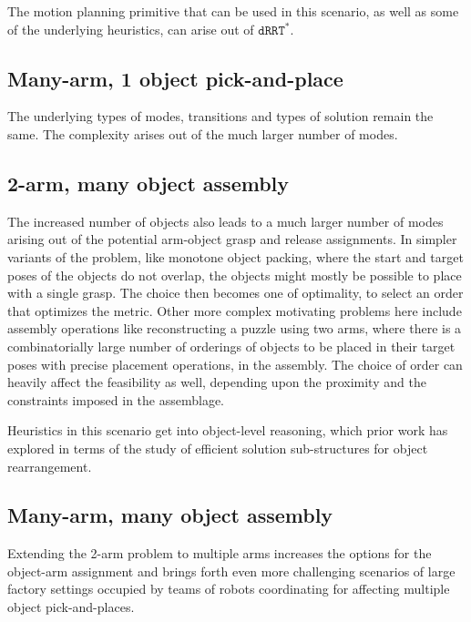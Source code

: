The motion planning primitive that can be used in this scenario, as well as some of the underlying heuristics, can arise out of $\mathtt{dRRT}^*$.

\subsection{Many-arm, 1 object pick-and-place}
The underlying types of modes, transitions and types of solution remain the same. The complexity arises out of the much larger number of modes.

\subsection{2-arm, many object assembly}
The increased number of objects also leads to a much larger number of modes arising out of the potential arm-object grasp and release assignments. In simpler variants of the problem, like monotone object packing, where the start and target poses of the objects do not overlap, the objects might mostly be possible to place with a single grasp. The choice then becomes one of optimality, to select an order that optimizes the metric. Other more complex motivating problems here include assembly operations like reconstructing a puzzle using two arms, where there is a combinatorially large number of orderings of objects to be placed in their target poses with precise placement operations, in the assembly. The choice of order can heavily affect the feasibility as well, depending upon the proximity and the constraints imposed in the assemblage.

Heuristics in this scenario get into object-level reasoning, which prior work \cite{shome2018rearrangement} has explored in terms of the study of efficient solution sub-structures for object rearrangement.

\subsection{Many-arm, many object assembly}
Extending the 2-arm problem to multiple arms increases the options for the object-arm assignment and brings forth even more challenging scenarios of large factory settings occupied by teams of robots coordinating for affecting multiple object pick-and-places.